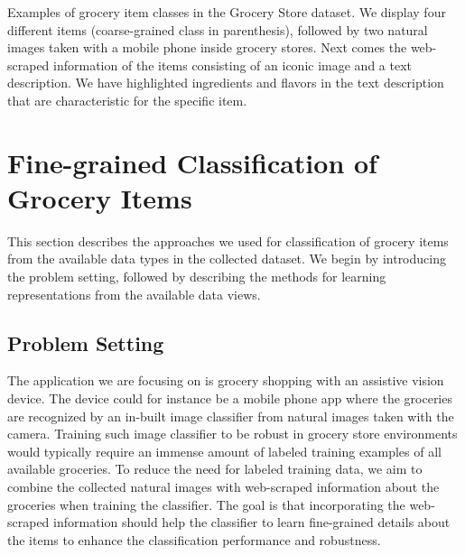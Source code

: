 \begin{table}[t]
	\centering
	\caption{\small{ Examples of grocery item classes in the Grocery Store dataset. We display four different items (coarse-grained class in parenthesis), followed by two natural images taken with a mobile phone inside grocery stores. Next comes the web-scraped information of the items consisting of an iconic image and a text description. We have highlighted ingredients and flavors in the text description that are characteristic for the specific item. }}
	\vspace{-10pt}
	\setlength{\fboxsep}{0pt} 
	\setlength{\fboxrule}{0.33pt}
	
	\label{tab:grocery_store_dataset}
\end{table}

\section{Fine-grained Classification of Grocery Items}

This section describes the approaches we used for classification of grocery items from the available data types in the collected dataset. We begin by introducing the problem setting, followed by describing the methods for learning representations from the available data views. 

\subsection{Problem Setting}

The application we are focusing on is grocery shopping with an assistive vision device. The device could for instance be a mobile phone app where the groceries are recognized by an in-built image classifier from natural images taken with the camera. Training such image classifier to be robust in grocery store environments would typically require an immense amount of labeled training examples of all available groceries. To reduce the need for labeled training data, we aim to combine the collected natural images with web-scraped information about the groceries when training the classifier. The goal is that incorporating the web-scraped information should help the classifier to learn fine-grained details about the items to enhance the classification performance and robustness. 

